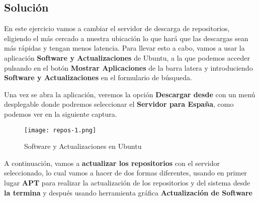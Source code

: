 \subsection{Solución}
En este ejercicio vamos a cambiar el servidor de descarga de repositorios, eligiendo el más cercado a nuestra ubicación lo que hará que las descargas sean más rápidas y tengan menos latencia. Para llevar esto a cabo, vamos a usar la aplicación \textbf{Software y Actualizaciones} de Ubuntu, a la que podemos acceder pulsando en el botón \textbf{Mostrar Aplicaciones} de la barra latera y introduciendo \textbf{Software y Actualizaciones} en el formulario de búsqueda.

Una vez se abra la aplicación, veremos la opción \textbf{Descargar desde} con un menú desplegable donde podremos seleccionar el \textbf{Servidor para España}, como podemos ver en la siguiente captura.

\begin{figure}[H]
    \centering
    \texttt{[image: repos-1.png]}
    \caption{Software y Actualizaciones en Ubuntu}
\end{figure}

A continuación, vamos a \textbf{actualizar los repositorios} con el servidor seleccionado, lo cual vamos a hacer de dos formas diferentes, usando en primer lugar \textbf{APT} para realizar la actualización de los repositorios y del sistema desde \textbf{la termina} y después usando herramienta gráfica \textbf{Actualización de Software}

